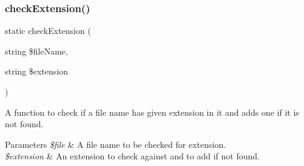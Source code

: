 \subsubsection{check\+Extension()}
{\footnotesize\ttfamily static check\+Extension (\begin{DoxyParamCaption}\item[{string}]{\$file\+Name,  }\item[{string}]{\$extension }\end{DoxyParamCaption})\hspace{0.3cm}{\ttfamily [static]}}

A function to check if a file name has given extension in it and adds one if it is not found. 
\begin{DoxyParams}{Parameters}
{\em \$file} & A file name to be checked for extension. \\
\hline
{\em \$extension} & An extension to check against and to add if not found. \\
\hline
\end{DoxyParams}

